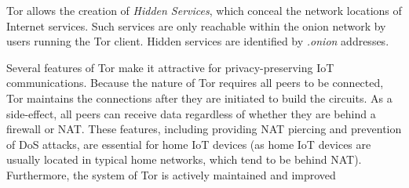 Tor allows the creation of \textit{Hidden Services}, which conceal the network locations of Internet services. Such services are only reachable within the onion network by users running the Tor client. Hidden services are identified by \textit{.onion} addresses.

Several features of Tor make it attractive for privacy-preserving IoT communications. Because the nature of Tor requires all peers to be connected, Tor maintains the connections after they are initiated to build the circuits. As a side-effect, all peers can receive data regardless of whether they are behind a firewall or NAT. These features, including providing NAT piercing and prevention of DoS attacks, are essential for home IoT devices (as home IoT devices are usually located in typical home networks, which tend to be behind NAT). Furthermore, the system of Tor is actively maintained and improved